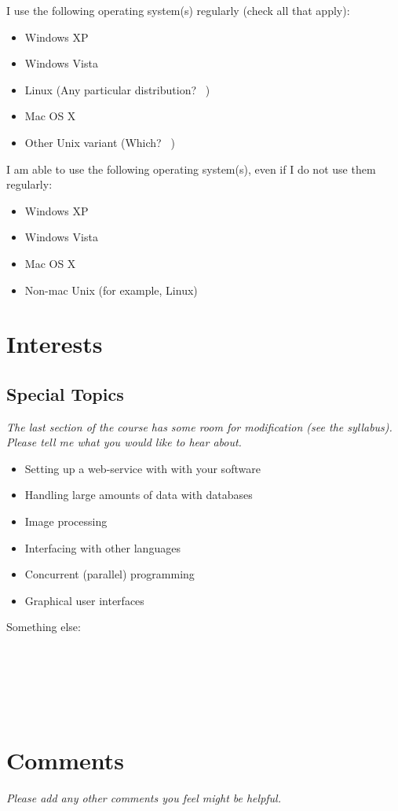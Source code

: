 \documentclass[article,twoside]{memoir}
\newcommand*{\fillunderscore}{~\hrulefill}
\newcommand*{\checkbox}{$\square$}
\newcommand{\header}[1]{\textsl{#1}}
\begin{document}
I use the following operating system(s) regularly (check all that apply):
\begin{itemize}[\checkbox]
\item Windows XP
\item Windows Vista
\item Linux (Any particular distribution? \fillunderscore)
\item Mac OS X
\item Other Unix variant (Which? \fillunderscore)
\end{itemize}

\medskip

I am able to use the following operating system(s), even if I do not use them regularly:
\begin{itemize}[\checkbox]
\item Windows XP
\item Windows Vista
\item Mac OS X
\item Non-mac Unix (for example, Linux)
\end{itemize}

\chapter{Interests}

\section{Special Topics}

\header{The last section of the course has some room for modification (see the syllabus). Please tell me what you would like to hear about.}

\begin{itemize}[\checkbox]
\item Setting up a web-service with with your software
\item Handling large amounts of data with databases
\item Image processing
\item Interfacing with other languages
\item Concurrent (parallel) programming
\item Graphical user interfaces
\end{itemize}

Something else: \fillunderscore\par
\fillunderscore\par
\fillunderscore\par
\fillunderscore

\chapter{Comments}

\header{Please add any other comments you feel might be helpful.}

\fillunderscore\par
\fillunderscore\par
\fillunderscore\par
\fillunderscore\par
\fillunderscore\par
\fillunderscore\par
\fillunderscore\par
\fillunderscore\par
\fillunderscore
\end{document}
